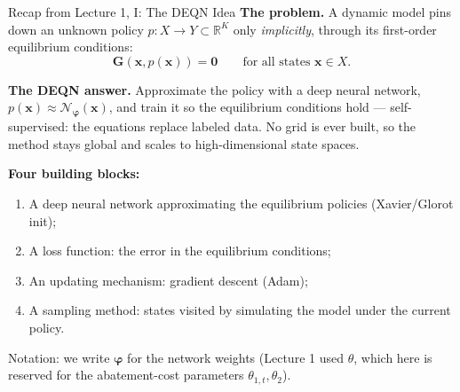 \documentclass[aspectratio=169,11pt]{beamer}
\newcommand{\emphc}[1]{\textcolor{harvardcrimson}{#1}}
\newcommand{\x}{\bm{x}}
\newcommand{\R}{\mathbb{R}}
\newcommand{\nn}{\mathcal{N}_{\bm{\varphi}}}
\begin{document}
\begin{frame}{Recap from Lecture 1, I: The DEQN Idea}
\small
\textbf{The problem.} A dynamic model pins down an unknown policy $p: X \to Y \subset \R^K$ only \emph{implicitly}, through its first-order equilibrium conditions:
\[
\mathbf{G}(\x, p(\x)) = \bm{0} \qquad \text{for all states } \x \in X .
\]

\vspace{0.1cm}
\textbf{The DEQN answer.} Approximate the policy with a deep neural network, $p(\x) \approx \nn(\x)$, and train it so the equilibrium conditions hold --- \emphc{self-supervised}: the equations replace labeled data. No grid is ever built, so the method stays \emphc{global} and scales to high-dimensional state spaces.

\vspace{0.15cm}
\textbf{Four building blocks:}
\begin{enumerate}
    \item A deep neural network approximating the equilibrium policies (Xavier/Glorot init);
    \item A loss function: the error in the equilibrium conditions;
    \item An updating mechanism: gradient descent (Adam);
    \item A sampling method: states visited by \emphc{simulating the model} under the current policy.
\end{enumerate}

\vspace{0.1cm}
{\footnotesize Notation: we write $\bm{\varphi}$ for the network weights (Lecture 1 used $\theta$, which here is reserved for the abatement-cost parameters $\theta_{1,t}, \theta_2$).}
\end{frame}
\end{document}
